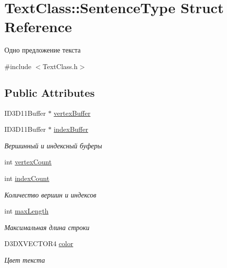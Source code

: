 \hypertarget{struct_text_class_1_1_sentence_type}{}\section{Text\+Class\+:\+:Sentence\+Type Struct Reference}
\label{struct_text_class_1_1_sentence_type}


Одно предложение текста  




{\ttfamily \#include $<$Text\+Class.\+h$>$}

\subsection*{Public Attributes}
\begin{DoxyCompactItemize}
\item 
I\+D3\+D11\+Buffer $\ast$ \hyperlink{struct_text_class_1_1_sentence_type_a8c365b486f9d1022e1a242deb3f390cc}{vertex\+Buffer}
\item 
I\+D3\+D11\+Buffer $\ast$ \hyperlink{struct_text_class_1_1_sentence_type_a85f1c8a80d7c2d14ed1e808282efa95b}{index\+Buffer}
\begin{DoxyCompactList}\small\item\em Вершинный и индексный буферы \end{DoxyCompactList}\item 
int \hyperlink{struct_text_class_1_1_sentence_type_a77ec0078cc53322e88ad03c68d8a15e4}{vertex\+Count}
\item 
int \hyperlink{struct_text_class_1_1_sentence_type_ab15fb285ec42e52c38ca1e2e498896c7}{index\+Count}
\begin{DoxyCompactList}\small\item\em Количество вершин и индексов \end{DoxyCompactList}\item 
int \hyperlink{struct_text_class_1_1_sentence_type_ae31ce3d9783507b638219d837a58b725}{max\+Length}
\begin{DoxyCompactList}\small\item\em Максимальная длина строки \end{DoxyCompactList}\item 
D3\+D\+X\+V\+E\+C\+T\+O\+R4 \hyperlink{struct_text_class_1_1_sentence_type_a8caa4b3ab0f14ef649f5edcb2ce03de8}{color}
\begin{DoxyCompactList}\small\item\em Цвет текста \end{DoxyCompactList}\end{DoxyCompactItemize}


